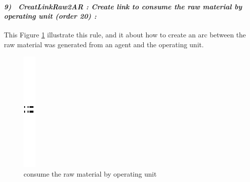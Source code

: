 \pagebreak
\paragraph{\emph{9)~ CreatLinkRaw2AR : Create link to consume the raw material by operating unit  (order 20) :} }
 
 
This Figure \ref{fig:consume the raw material by operating unit}  illustrate  this rule, and it about how to create an arc between 
the raw material was generated from an agent and the operating unit.

\begin{figure}[th]
\centering
		\quad{}\quad{}
			\includegraphics{ch3/img/sep}
	\quad{}\quad{}
\caption{\label{fig:consume the raw material by operating unit} consume the raw material by operating unit}
\end{figure}

